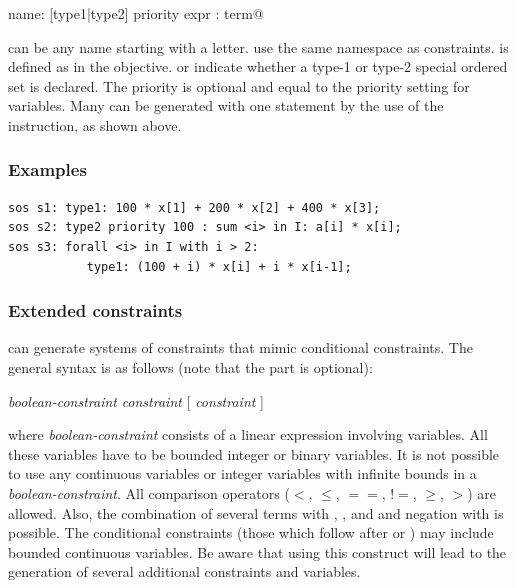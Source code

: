 \smallskip
\verb@sos name: [type1|type2] priority expr : term@

\smallskip
\noindent {} can be any name starting with a letter. \sos use
the same namespace as constraints.
 is defined as in the objective.  or
 indicate whether a type-1 or type-2 special ordered set
is declared. The priority is optional and equal to the priority
setting for variables.
Many \sos can be generated with one statement by the use of the
 instruction, as shown above.

\subsubsection{Examples}
{\small
\begin{verbatim}
sos s1: type1: 100 * x[1] + 200 * x[2] + 400 * x[3];
sos s2: type2 priority 100 : sum <i> in I: a[i] * x[i];
sos s3: forall <i> in I with i > 2:
           type1: (100 + i) * x[i] + i * x[i-1];
\end{verbatim}
}

\subsubsection{Extended constraints}
\zimpl can generate systems of constraints that
mimic conditional constraints. The general syntax is as follows (note
that the  part is optional):

\smallskip
\centerline{
 \emph{boolean-constraint}  \emph{constraint}
[  \emph{constraint} ] }

\smallskip
\noindent where \emph{boolean-constraint} consists of a linear expression involving
variables. All these variables have to be bounded integer or binary
variables. It is not possible to use any continuous variables or integer
variables with infinite bounds in a \emph{boolean-constraint}.
All comparison operators ($<$, $\le$, $==$, $!\!\!=$, $\ge$, $>$) are
allowed. Also, the combination of several terms with ,
, and  and negation with  is possible.
The conditional constraints (those which follow after  or
) may include bounded continuous variables.
Be aware that using this construct will lead to
the generation of several additional constraints and variables.

